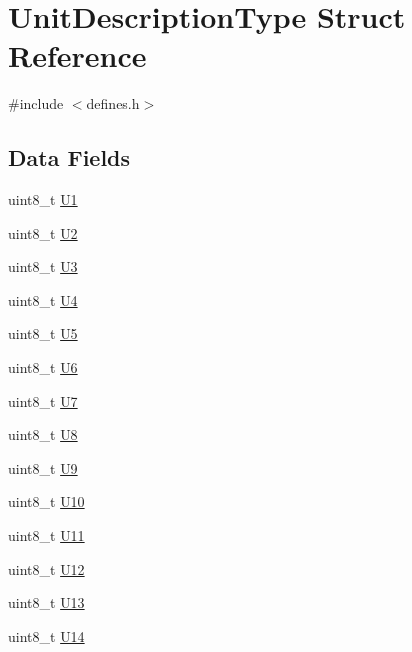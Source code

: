 \hypertarget{structUnitDescriptionType}{\section{Unit\-Description\-Type Struct Reference}
\label{structUnitDescriptionType}
}


{\ttfamily \#include $<$defines.\-h$>$}

\subsection*{Data Fields}
\begin{DoxyCompactItemize}
\item 
uint8\-\_\-t \hyperlink{structUnitDescriptionType_a3752aa69edf4c75a4d7a00cead8074a4}{U1}
\item 
uint8\-\_\-t \hyperlink{structUnitDescriptionType_ac6fad13d43afdf94c34b6f3a304a7005}{U2}
\item 
uint8\-\_\-t \hyperlink{structUnitDescriptionType_ab3e64923796c7974898273319bc0356a}{U3}
\item 
uint8\-\_\-t \hyperlink{structUnitDescriptionType_af67d7027e3b93c0d1c6c9e316c31da52}{U4}
\item 
uint8\-\_\-t \hyperlink{structUnitDescriptionType_ab11845623074981c46cbe7af4a5964cd}{U5}
\item 
uint8\-\_\-t \hyperlink{structUnitDescriptionType_a8c7c9b56c879d736a289183fcee17b84}{U6}
\item 
uint8\-\_\-t \hyperlink{structUnitDescriptionType_a9b90dfa70ea1e381a0ea6032ca804ad6}{U7}
\item 
uint8\-\_\-t \hyperlink{structUnitDescriptionType_adea079c655e18cac88ad05a8243f22f8}{U8}
\item 
uint8\-\_\-t \hyperlink{structUnitDescriptionType_a23817cabba1909bcf5a0732ed5da1351}{U9}
\item 
uint8\-\_\-t \hyperlink{structUnitDescriptionType_a2751eba36a1207fbeed39f8c1b99dd17}{U10}
\item 
uint8\-\_\-t \hyperlink{structUnitDescriptionType_a73d351d321ae6bbcd5ad8c14c96ad0a8}{U11}
\item 
uint8\-\_\-t \hyperlink{structUnitDescriptionType_a31d9700085a4dcf3e0d2298e8c877f5f}{U12}
\item 
uint8\-\_\-t \hyperlink{structUnitDescriptionType_a686a531e040eca159c41bba7705d8963}{U13}
\item 
uint8\-\_\-t \hyperlink{structUnitDescriptionType_a4a6129e1bed33bf743895f5864208cc0}{U14}

\end{DoxyCompactItemize}
